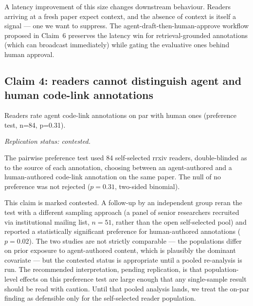 \documentclass{rrxiv}
\begin{document}
A latency improvement of this size changes downstream behaviour. Readers arriving at a fresh paper expect context, and the absence of context is itself a signal --- one we want to suppress. The agent-draft-then-human-approve workflow proposed in Claim~6 preserves the latency win for retrieval-grounded annotations (which can broadcast immediately) while gating the evaluative ones behind human approval.


\subsection*{Claim 4: readers cannot distinguish agent and human code-link annotations}

\begin{claim}[type=theoretical, evidence=argument, confidence=0.4, rationale={Contested: an independent rerun on a different population found a significant human preference; population effects likely dominate any single-sample result}, labels={agents, editorial, reader-study, contested}, title={Reader parity on code-link annotations}]
\label{claim:c4}
Readers rate agent code-link annotations on par with human ones (preference test, n=84, p=0.31).

\emph{Replication status: contested.}
\end{claim}

The pairwise preference test used 84 self-selected rrxiv readers, double-blinded as to the source of each annotation, choosing between an agent-authored and a human-authored code-link annotation on the same paper. The null of no preference was not rejected ($p = 0.31$, two-sided binomial).

This claim is marked contested. A follow-up by an independent group reran the test with a different sampling approach (a panel of senior researchers recruited via institutional mailing list, $n=51$, rather than the open self-selected pool) and reported a statistically significant preference for human-authored annotations ($p = 0.02$). The two studies are not strictly comparable --- the populations differ on prior exposure to agent-authored content, which is plausibly the dominant covariate --- but the contested status is appropriate until a pooled re-analysis is run. The recommended interpretation, pending replication, is that population-level effects on this preference test are large enough that any single-sample result should be read with caution. Until that pooled analysis lands, we treat the on-par finding as defensible only for the self-selected reader population.
\end{document}
